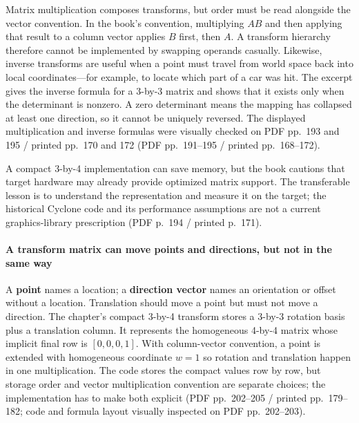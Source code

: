 Matrix multiplication composes transforms, but order must be read alongside the vector convention. In the book's convention, multiplying \(A B\) and then applying that result to a column vector applies \(B\) first, then \(A\). A transform hierarchy therefore cannot be implemented by swapping operands casually. Likewise, inverse transforms are useful when a point must travel from world space back into local coordinates---for example, to locate which part of a car was hit. The excerpt gives the inverse formula for a 3-by-3 matrix and shows that it exists only when the determinant is nonzero. A zero determinant means the mapping has collapsed at least one direction, so it cannot be uniquely reversed. The displayed multiplication and inverse formulas were visually checked on PDF pp.~193 and 195 / printed pp.~170 and 172 (PDF pp.~191--195 / printed pp.~168--172).

A compact 3-by-4 implementation can save memory, but the book cautions that target hardware may already provide optimized matrix support. The transferable lesson is to understand the representation and measure it on the target; the historical Cyclone code and its performance assumptions are not a current graphics-library prescription (PDF p.~194 / printed p.~171).

\paragraph{A transform matrix can move points and directions, but not in the same way}\label{06-engine-ii-ch025-a-transform-matrix-can-move-points-and-directions-but-not-in-the-same-way}

\hypertarget{06-engine-ii-ch025-a-transform-matrix-can-move-points-and-directions-but-not-in-the-same-way}{}

A \textbf{point} names a location; a \textbf{direction vector} names an orientation or offset without a location. Translation should move a point but must not move a direction. The chapter's compact 3-by-4 transform stores a 3-by-3 rotation basis plus a translation column. It represents the homogeneous 4-by-4 matrix whose implicit final row is \([0,0,0,1]\). With column-vector convention, a point is extended with homogeneous coordinate \(w=1\) so rotation and translation happen in one multiplication. The code stores the compact values row by row, but storage order and vector multiplication convention are separate choices; the implementation has to make both explicit (PDF pp.~202--205 / printed pp.~179--182; code and formula layout visually inspected on PDF pp.~202--203).

